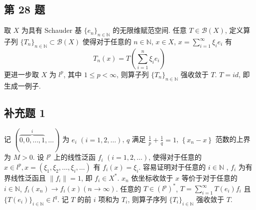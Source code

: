 \documentclass[\ROOT/main.tex]{subfiles}
\begin{document}
\subsection{第 28 题}
取 $X$ 为具有 Schauder 基 $\{ e_{n} \}_{n \in \mathbb{N}}$ 的无限维赋范空间.
任意 $T \in \mathscr{B} \left( X \right)$, 定义算子列 $\{ T_{n} \}_{n \in \mathbb{N}} \subset \mathscr{B} \left( X \right)$
使得对于任意的 $n \in \mathbb{N}$, $x \in X$, $x = \sum_{i = 1}^{\infty} \xi_i e_i$ 有
\[
    T_n \left( x \right) = T \left( \sum_{i = 1}^{n} \xi_i e_i \right)
\]
更进一步取 $X$ 为 $l^p$, 其中 $1 \leqslant p < \infty$,
则算子列 $\{ T_{n} \}_{n \in \mathbb{N}}$ 强收敛于 $T$.
$T = id$, 即生成一例子.

\subsection{补充题 1}
记 $( \overbrace{0, 0, \dots , 1}^i, \dots )$ 为 $e_i$ $\left( i = 1, 2, \dots \right)$,
$q$ 满足 $\frac{1}{p} + \frac{1}{q} = 1$,
$\left\{ x_n - x \right\}$ 范数的上界为 $M > 0$.
设 $l^p$ 上的线性泛函 $f_i$ $(i = 1, 2, \dots)$,
使得对于任意的 $x \in l^p, x = \left( \xi_1, \xi_2, \dots , \xi_i, \dots \right)$ 有 $f_i \left( x \right) = \xi_i$.
容易证明对于任意的 $i \in \mathbb{N}$ , $f_i$ 为有界线性泛函且 $\| f_i \| = 1$, 即 $f_i \in X^*$.
$x_n$ 依坐标收敛于 $x$ 等价于对于任意的 $i \in \mathbb{N}$, $f_i \left( x_n \right) \to f_i \left( x \right) \left( n \to \infty \right)$.
任意的 $T \in \left( l^p \right)^*$, $T = \sum_{i = 1}^{\infty} T \left( e_i \right) f_i$ 且 $\{ T \left( e_{i} \right) \}_{i \in \mathbb{N}} \in l^q$.
记 $T$ 的前 $i$ 项和为 $T_i$, 则算子序列 $\{ T_{i} \}_{i \in \mathbb{N}}$ 强收敛于 $T$.
\end{document}
